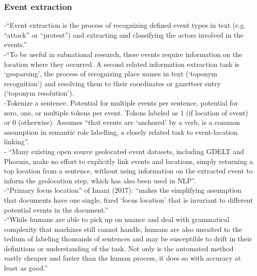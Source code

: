 \subsubsection{Event extraction}
-{\color{orange}“Event extraction is the process of recognizing defined event types in text (e.g. “attack” or “protest”) and extracting and classifying the actors involved in the events.”\cite{Halterman2019}}\\
-{\color{orange}“To be useful in subnational research, these events require information on the location where they occurred. A second related information extraction task is ‘geoparsing’, the process of recognizing place names in text (‘toponym recognition’) and resolving them to their coordinates or gazetteer entry (‘toponym resolution’).\cite{Halterman2019}}\\
-{\color{orange}Tokenize a sentence. Potential for multiple events per sentence, potential for zero, one, or multiple tokens per event. Tokens labeled as 1 (if location of event) or 0 (otherwise). Assumes “that events are ‘anchored’ by a verb, is a common assumption in semantic role labelling, a closely related task to event-location linking”. \cite{Halterman2019}}\\
-{\color{orange} “Many existing open source geolocated event datasets, including GDELT and Phoenix, make no effort to explicitly link events and locations, simply returning a top location from a sentence, without using information on the extracted event to inform the geolocation step, which has also been used in NLP”.\cite{Halterman2010}}\\
-{\color{orange}“Primary focus location” of Imani (2017): “makes the simplifying assumption that documents have one single, fixed ‘focus location’ that is invariant to different potential events in the document.”\cite{Halterman2019}}\\
-{\color{orange}“While humans are able to pick up on nuance and deal with grammatical complexity that machines still cannot handle, humans are also unsuited to the tedium of labeling thousands of sentences and may be susceptible to drift in their definitions or understanding of the task. Not only is the automated method vastly cheaper and faster than the human process, it does so with accuracy at least as good.”\cite{Halterman2019}}\\
